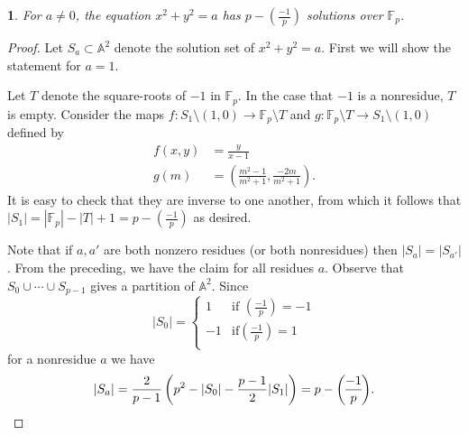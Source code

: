 \documentclass[10pt,a4paper]{amsart}
\numberwithin{equation}{section}
\numberwithin{figure}{section}
\theoremstyle{definition}
\theoremstyle{remark}
\theoremstyle{plain}
\theoremstyle{plain}
\theoremstyle{definition}
\theoremstyle{plain}
\newtheorem{prop}{\protect\propositionname}[section]
\theoremstyle{plain}
\providecommand{\propositionname}{Proposition}
\newcommand{\legendre}[2]{\genfrac{(}{)}{}{}{#1}{#2}}
\newcommand{\F}{\mathbb{F}}
\begin{document}
    \begin{prop}\label{prop:circle-solutions} 
        For $a \neq 0$, the equation $x^2 + y^2 = a$ has $p - \legendre{-1}{p}$ 
        solutions over $\F_p$.
    \end{prop} 
    \begin{proof} 
        Let $S_a \subset \mathbb{A}^2$ denote the solution set of $x^2 + y^2 = a$. 
        First we will show the statement for $a=1$.
    	
    	Let $T$ denote the square-roots of $-1$ in $\F_p$. In the case
        that $-1$ is a nonresidue, $T$ is empty. Consider the maps $f\colon S_1
        \setminus (1,0) \to \F_p \setminus T$ and $g\colon \F_p
        \setminus T \to S_1 \setminus (1,0)$ defined by 
        \begin{align*} 
            f(x,y) &= \frac{y}{x-1} \\ 
            g(m) &= \left(\frac{m^2 - 1}{m^2 + 1}, \frac{-2m}{m^2 + 1}\right).
        \end{align*} 
        It is easy to check that they are inverse to one
        another, from which it follows that $|S_1| = |\F_p| - |T| + 1 = p -
        \legendre{-1}{p}$ as desired.
    	
    	Note that if $a,a'$ are both nonzero residues (or both nonresidues)
        then $|S_a| = |S_{a'}|$. From the preceding, we have the claim for all residues
        $a$. Observe that $S_0 \cup \cdots \cup S_{p-1}$ gives a partition of
        $\mathbb{A}^2$. Since 
        \[ |S_0| = \begin{cases}
            1 & \text{if } \legendre{-1}{p} = -1 \\
            -1 & \text{if} \legendre{-1}{p} = 1 \\
        \end{cases} \] 
        for a nonresidue $a$ we have 
        \[ |S_a| = \frac{2}{p-1} 
                    \left(p^2 - |S_0| - \frac{p-1}{2}|S_1|\right) = 
                    p - \legendre{-1}{p}. \qedhere \] 
    \end{proof}
\end{document}
